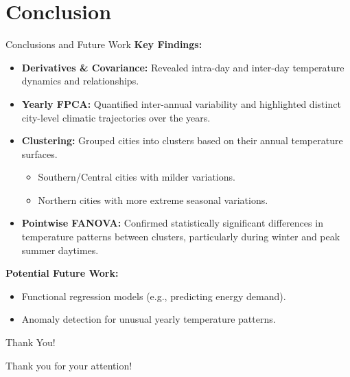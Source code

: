 \documentclass[svgnames, 12pt]{beamer}
\begin{document}
\section{Conclusion}
\begin{frame}{Conclusions and Future Work}
  \textbf{Key Findings:}
  \begin{itemize}
    \item \textbf{Derivatives \& Covariance:} Revealed intra-day and inter-day temperature dynamics and relationships.
    \item \textbf{Yearly FPCA:} Quantified inter-annual variability and highlighted distinct city-level climatic trajectories over the years.
    \item \textbf{Clustering:} Grouped cities into clusters based on their annual temperature surfaces.
        \begin{itemize}
            \item Southern/Central cities with milder variations.
            \item Northern cities with more extreme seasonal variations.
        \end{itemize}
    \item \textbf{Pointwise FANOVA:} Confirmed statistically significant differences in temperature patterns between clusters, particularly during winter and peak summer daytimes.
  \end{itemize}
  \pause
  \textbf{Potential Future Work:}
  \begin{itemize}
    \item Functional regression models (e.g., predicting energy demand).
    \item Anomaly detection for unusual yearly temperature patterns.
  \end{itemize}
\end{frame}

\begin{frame}{Thank You!}
	\begin{center}
		\Huge Thank you for your attention!
	\end{center}
\end{frame}
\end{document}
